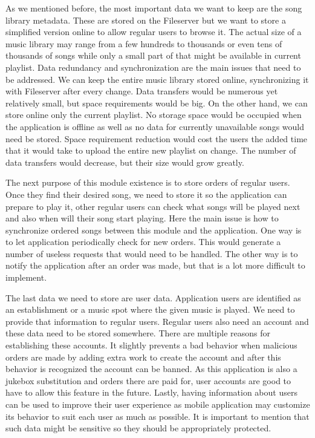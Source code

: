 As we mentioned before, the most important data we want to keep are the song library metadata. These are stored on the Fileserver but we want to store a simplified version online to allow regular users to browse it. The actual size of a music library may range from a few hundreds to thousands or even tens of thousands of songs while only a small part of that might be available in current playlist. Data redundancy and synchronization are the main issues that need to be addressed. We can keep the entire music library stored online, synchronizing it with Fileserver after every change. Data transfers would be numerous yet relatively small, but space requirements would be big. On the other hand, we can store online only the current playlist. No storage space would be occupied when the application is offline as well as no data for currently unavailable songs would need be stored. Space requirement reduction would cost the users the added time that it would take to upload the entire new playlist on change. The number of data transfers would decrease, but their size would grow greatly.
\par
The next purpose of this module existence is to store orders of regular users. Once they find their desired song, we need to store it so the application can prepare to play it, other regular users can check what songs will be played next and also when will their song start playing. Here the main issue is how to synchronize ordered songs between this module and the application. One way is to let application periodically check for new orders. This would generate a number of useless requests that would need to be handled. The other way is to notify the application after an order was made, but that is a lot more difficult to implement.
\par
The last data we need to store are user data. Application users are identified as an establishment or a music spot where the given music is played. We need to provide that information to regular users. Regular users also need an account and these data need to be stored somewhere. There are multiple reasons for establishing these accounts. It slightly prevents a bad behavior when malicious orders are made by adding extra work to create the account and after this behavior is recognized the account can be banned. As this application is also a jukebox substitution and orders there are paid for, user accounts are good to have to allow this feature in the future. Lastly, having information about users can be used to improve their user experience as mobile application may customize its behavior to suit each user as much as possible. It is important to mention that such data might be sensitive so they should be appropriately protected.

